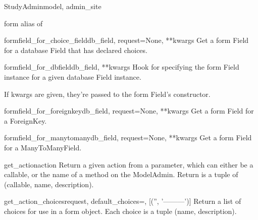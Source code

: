 \documentclass[letterpaper,10pt,english]{sphinxmanual}
\begin{document}
\begin{classdesc}{StudyAdmin}{model, admin\_site}
\hypertarget{data.admin.StudyAdmin.form}{}\begin{memberdesc}{form}
alias of 
\end{memberdesc}

\hypertarget{data.admin.StudyAdmin.formfield_for_choice_field}{}\begin{methoddesc}{formfield\_for\_choice\_field}{db\_field, request=None, **kwargs}
Get a form Field for a database Field that has declared choices.
\end{methoddesc}

\hypertarget{data.admin.StudyAdmin.formfield_for_dbfield}{}\begin{methoddesc}{formfield\_for\_dbfield}{db\_field, **kwargs}
Hook for specifying the form Field instance for a given database Field
instance.

If kwargs are given, they're passed to the form Field's constructor.
\end{methoddesc}

\hypertarget{data.admin.StudyAdmin.formfield_for_foreignkey}{}\begin{methoddesc}{formfield\_for\_foreignkey}{db\_field, request=None, **kwargs}
Get a form Field for a ForeignKey.
\end{methoddesc}

\hypertarget{data.admin.StudyAdmin.formfield_for_manytomany}{}\begin{methoddesc}{formfield\_for\_manytomany}{db\_field, request=None, **kwargs}
Get a form Field for a ManyToManyField.
\end{methoddesc}

\hypertarget{data.admin.StudyAdmin.get_action}{}\begin{methoddesc}{get\_action}{action}
Return a given action from a parameter, which can either be a callable,
or the name of a method on the ModelAdmin.  Return is a tuple of
(callable, name, description).
\end{methoddesc}

\hypertarget{data.admin.StudyAdmin.get_action_choices}{}\begin{methoddesc}{get\_action\_choices}{request, default\_choices=, {[}('', '---------'){]}}
Return a list of choices for use in a form object.  Each choice is a
tuple (name, description).
\end{methoddesc}


\end{classdesc}
\end{document}
